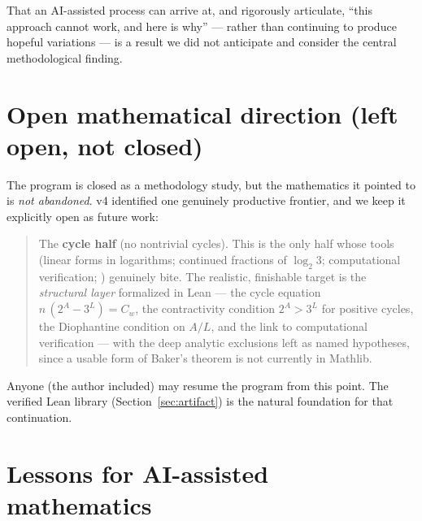 \documentclass[11pt,a4paper]{article}
\theoremstyle{definition}
\begin{document}
That an AI-assisted process can arrive at, and rigorously articulate, ``this
approach cannot work, and here is why'' --- rather than continuing to produce
hopeful variations --- is a result we did not anticipate and consider the
central methodological finding.

\section{Open mathematical direction (left open, not closed)}
\label{sec:open}

The program is closed as a methodology study, but the mathematics it pointed
to is \emph{not abandoned}. v4 identified one genuinely productive frontier,
and we keep it explicitly open as future work:

\begin{quote}
The \textbf{cycle half} (no nontrivial cycles). This is the only half whose
tools (linear forms in logarithms; continued fractions of $\log_2 3$;
computational verification; \cite{steiner1977, simons2005, simonsdeweger2005,
barina2021}) genuinely bite. The realistic, finishable target is the
\emph{structural layer} formalized in Lean --- the cycle equation
$n\,(2^A - 3^L) = C_w$, the contractivity condition $2^A > 3^L$ for positive
cycles, the Diophantine condition on $A/L$, and the link to computational
verification --- with the deep analytic exclusions left as named hypotheses,
since a usable form of Baker's theorem is not currently in Mathlib.
\end{quote}

Anyone (the author included) may resume the program from this point. The
verified Lean library (Section~\ref{sec:artifact}) is the natural foundation
for that continuation.

\section{Lessons for AI-assisted mathematics}
\label{sec:lessons}
\end{document}
